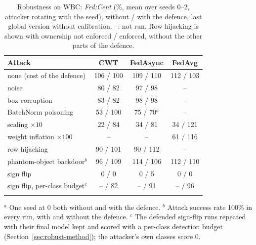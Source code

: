 \documentclass[pdflatex,sn-mathphys-num]{sn-jnl}
\newcommand{\fedcent}{\textit{Fed:Cent}}
\begin{document}
\begin{table}[t]
\caption{Robustness on WBC: \fedcent{} (\%, mean over seeds 0--2, attacker rotating with the seed), without / with the defence, last global version without calibration. --: not run. Row hijacking is shown with ownership not enforced / enforced, without the other parts of the defence.}\label{tab:robust}
\footnotesize
\begin{tabular*}{\textwidth}{@{\extracolsep\fill}lccc}
\toprule
Attack & CWT & FedAsync & FedAvg \\
\midrule
none (cost of the defence) & 106 / 100 & 109 / 110 & 112 / 103 \\
noise & 80 / 82 & 97 / 98 & -- \\
box corruption & 83 / 82 & 98 / 98 & -- \\
BatchNorm poisoning & 53 / 100 & 75 / 70$^{a}$ & -- \\
scaling $\times10$ & 22 / 84 & 34 / 81 & 34 / 121 \\
weight inflation $\times100$ & -- & -- & 61 / 116 \\
row hijacking & 90 / 101 & 90 / 112 & -- \\
phantom-object backdoor$^{b}$ & 96 / 109 & 114 / 106 & 112 / 110 \\
sign flip & 0 / 0 & 0 / 5 & 0 / 0 \\
sign flip, per-class budget$^{c}$ & -- / 82 & -- / 91 & -- / 96 \\
\botrule
\end{tabular*}
\footnotesize{$^{a}$ One seed at 0 both without and with the defence. $^{b}$ Attack success rate 100\% in every run, with and without the defence. $^{c}$ The defended sign-flip runs repeated with their final model kept and scored with a per-class detection budget (Section~\ref{sec:robust-method}); the attacker's own classes score 0.}
\end{table}
\end{document}
